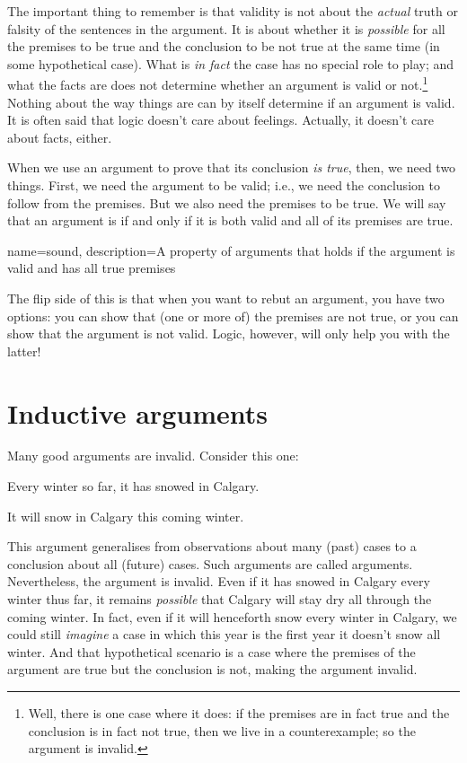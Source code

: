 The important thing to remember is that validity is not about the \emph{actual} truth or falsity of the sentences in the argument. It is about whether it is \emph{possible} for all the premises to be true and the conclusion to be not true at the same time (in some hypothetical case). What is \emph{in fact} the case has no special role to play; and what the facts are does not determine whether an argument is valid or not.\footnote{Well, there is one case where it does: if the premises are in fact true and the conclusion is in fact not true, then we live in a counterexample; so the argument is invalid.} Nothing about the way things are can by itself determine if an argument is valid. It is often said that logic doesn't care about feelings. Actually, it doesn't care about facts, either.

When we use an argument to prove that its conclusion \emph{is true}, then, we need two things. First, we need the argument to be valid; i.e., we need the conclusion to follow from the premises. But we also need the premises to be true. We will say that an argument is  if and only if it is both valid and all of its premises are true.

{
name=sound,
description={A property of arguments that holds if the argument is valid and has all true premises}
}

The flip side of this is that when you want to rebut an argument, you have two options: you can show that (one or more of) the premises are not true, or you can show that the argument is not valid.  Logic, however, will only help you with the latter!  

\section{Inductive arguments}

Many good arguments are invalid. Consider this one:
	\begin{earg}
		\item[] Every winter so far, it has snowed in Calgary.
	\item[\texttherefore] It will snow in Calgary this coming winter.
\end{earg}
This argument generalises from observations about many (past) cases to a conclusion about all (future) cases. Such arguments are called  arguments. Nevertheless, the argument is invalid. Even if it has snowed in Calgary every winter thus far, it remains \emph{possible} that Calgary will stay dry all through the coming winter. In fact, even if it will henceforth snow every winter in Calgary, we could still \emph{imagine} a case in which this year is the first year it doesn't snow all winter. And that hypothetical scenario is a case where the premises of the argument are true but the conclusion is not, making the argument invalid.

